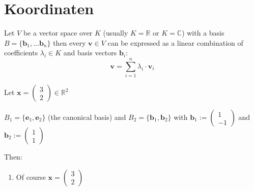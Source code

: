 


\section{Koordinaten}


Let $V$ be a vector space over $K$ (usually $K=\mathbb{R}$ or $K=\mathbb{C}$) with a basis $B=\{\bm{b}_1, ... \bm{b}_n\}$ then every $\bm{v} \in V$ can be expressed as a linear combination of coefficients $\lambda_i \in K$ and basis vectors $\bm{b}_i$:
\begin{equation}
    \bm{v} = \sum_{i=1}^n \lambda_i \cdot \bm{v}_i
\end{equation} 

\begin{example}
    Let $\bm{x}=\begin{pmatrix}
    3\\2
    \end{pmatrix} \in \mathbb{R}^2$
    
    $B_1 = \{\bm{e}_1, \bm{e}_2\}$ (the canonical basis) and $B_2=\{\bm{b}_1, \bm{b}_2\}$ with $\bm{b}_1:=\begin{pmatrix}
    1\\-1
    \end{pmatrix}$ and $\bm{b}_2:=\begin{pmatrix}
    1\\1
    \end{pmatrix}$

    Then: 
    \begin{enumerate}[itemsep=3pt, topsep=3pt]
        \item Of course $\bm{x}=\begin{pmatrix}
            3\\2
            \end{pmatrix}$
    \end{enumerate}
\end{example}


